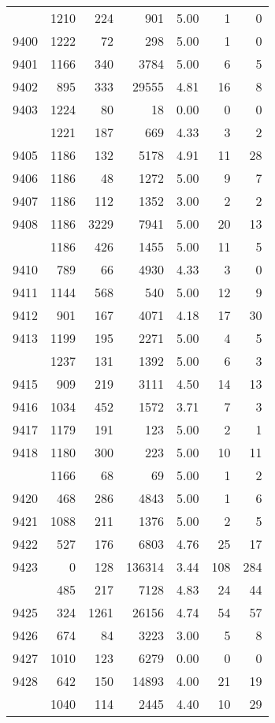 \documentclass[
]{article}
\begin{document}
\begin{table}
\begin{tabular}[t]{lrrrrrr}
\addlinespace
9399 & 1210 & 224 & 901 & 5.00 & 1 & 0\\
9400 & 1222 & 72 & 298 & 5.00 & 1 & 0\\
9401 & 1166 & 340 & 3784 & 5.00 & 6 & 5\\
9402 & 895 & 333 & 29555 & 4.81 & 16 & 8\\
9403 & 1224 & 80 & 18 & 0.00 & 0 & 0\\
\addlinespace
9404 & 1221 & 187 & 669 & 4.33 & 3 & 2\\
9405 & 1186 & 132 & 5178 & 4.91 & 11 & 28\\
9406 & 1186 & 48 & 1272 & 5.00 & 9 & 7\\
9407 & 1186 & 112 & 1352 & 3.00 & 2 & 2\\
9408 & 1186 & 3229 & 7941 & 5.00 & 20 & 13\\
\addlinespace
9409 & 1186 & 426 & 1455 & 5.00 & 11 & 5\\
9410 & 789 & 66 & 4930 & 4.33 & 3 & 0\\
9411 & 1144 & 568 & 540 & 5.00 & 12 & 9\\
9412 & 901 & 167 & 4071 & 4.18 & 17 & 30\\
9413 & 1199 & 195 & 2271 & 5.00 & 4 & 5\\
\addlinespace
9414 & 1237 & 131 & 1392 & 5.00 & 6 & 3\\
9415 & 909 & 219 & 3111 & 4.50 & 14 & 13\\
9416 & 1034 & 452 & 1572 & 3.71 & 7 & 3\\
9417 & 1179 & 191 & 123 & 5.00 & 2 & 1\\
9418 & 1180 & 300 & 223 & 5.00 & 10 & 11\\
\addlinespace
9419 & 1166 & 68 & 69 & 5.00 & 1 & 2\\
9420 & 468 & 286 & 4843 & 5.00 & 1 & 6\\
9421 & 1088 & 211 & 1376 & 5.00 & 2 & 5\\
9422 & 527 & 176 & 6803 & 4.76 & 25 & 17\\
9423 & 0 & 128 & 136314 & 3.44 & 108 & 284\\
\addlinespace
9424 & 485 & 217 & 7128 & 4.83 & 24 & 44\\
9425 & 324 & 1261 & 26156 & 4.74 & 54 & 57\\
9426 & 674 & 84 & 3223 & 3.00 & 5 & 8\\
9427 & 1010 & 123 & 6279 & 0.00 & 0 & 0\\
9428 & 642 & 150 & 14893 & 4.00 & 21 & 19\\
\addlinespace
9429 & 1040 & 114 & 2445 & 4.40 & 10 & 29\\

\end{tabular}
\end{table}
\end{document}
